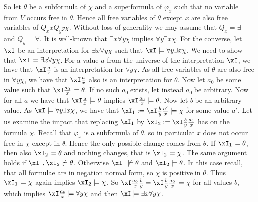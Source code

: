 \documentclass{LMCS}
\renewcommand{\phi}{\varphi}
\begin{document}
So let $\theta$ be a subformula of $\chi$ and a superformula of $\phi_x$ 
such that no variable from $V$ occurs free in $\theta$. 
Hence all free variables of $\theta$ except $x$ 
are also free variables of $Q_xxQ_yy\chi$. 
Without loss of generality we may assume that $Q_x=\exists$ and $Q_y=\forall$. 
It is well-known that $\exists x\forall y\chi$ 
implies $\forall y\exists x\chi$. 
For the converse, 
let $\xI$ be an interpretation for $\exists x\forall y\chi$ 
such that $\xI\models\forall y\exists x\chi$. 
We need to show that $\xI\models\exists x\forall y\chi$. 
For a value $a$ from the universe of the interpretation $\xI$, 
we have that $\xI\frac ax$ is an interpretation for $\forall y\chi$.
As all free variables of $\theta$ are also free in $\forall y\chi$, 
we have that $\xI\frac ax$ also is an interpretation for $\theta$. 
Now let $a_0$ be some value such that $\xI\frac{a_0}x\models\theta$. 
If no such $a_0$ exists, let instead $a_0$ be arbitrary. 
Now for all $a$ we have that $\xI\frac ax\models\theta$ 
implies $\xI\frac{a_0}x\models\theta$. 
Now let $b$ be an arbitrary value. 
As $\xI\models\forall y\exists x\chi$, we have that 
$\xI_1:=\xI\frac by\frac{a'}x\models\chi$ for some value $a'$. 
Let us examine the impact that replacing $\xI_1$ 
by $\xI_2:=\xI\frac by\frac{a_0}x$ has on the formula $\chi$. 
Recall that $\phi_x$ is a subformula of $\theta$, 
so in particular $x$ does not occur free in $\chi$ except in $\theta$. 
Hence the only possible change comes from $\theta$. 
If $\xI_1\models\theta$, then also $\xI_2\models\theta$ and nothing changes, 
that is $\xI_2\models\chi$. 
The same argument holds if $\xI_1,\xI_2\not\models\theta$. 
Otherwise $\xI_1\not\models\theta$ and $\xI_2\models\theta$. 
In this case recall, that all formulae are in negation normal form, 
so $\chi$ is positive in $\theta$. 
Thus $\xI_1\models\chi$ again implies $\xI_2\models\chi$. 
So $\xI\frac{a_0}x\frac by=\xI\frac by\frac{a_0}x\models\chi$ 
for all values $b$, 
which implies $\xI\frac{a_0}x\models\forall y\chi$ 
and then $\xI\models\exists x\forall y\chi$. 
\end{document}
